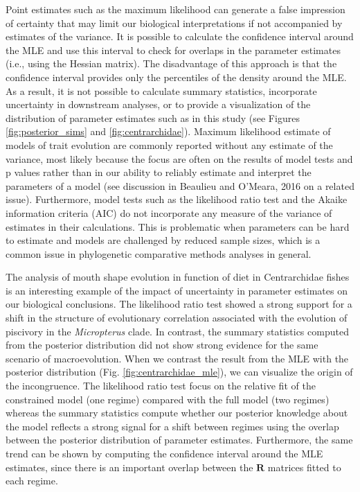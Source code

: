 Point estimates such as the maximum likelihood can generate a false impression of certainty that may limit our biological interpretations if not accompanied by estimates of the variance. It is possible to calculate the confidence interval around the MLE and use this interval to check for overlaps in the parameter estimates (i.e., using the Hessian matrix). The disadvantage of this approach is that the confidence interval provides only the percentiles of the density around the MLE. As a result, it is not possible to calculate summary statistics, incorporate uncertainty in downstream analyses, or to provide a visualization of the distribution of parameter estimates such as in this study (see Figures \ref{fig:posterior_sims} and \ref{fig:centrarchidae}). Maximum likelihood estimate of models of trait evolution are commonly reported without any estimate of the variance, most likely because the focus are often on the results of model tests and p values rather than in our ability to reliably estimate and interpret the parameters of a model (see discussion in Beaulieu and O'Meara, 2016 on a related issue). Furthermore, model tests such as the likelihood ratio test and the Akaike information criteria (AIC) do not incorporate any measure of the variance of estimates in their calculations. This is problematic when parameters can be hard to estimate and models are challenged by reduced sample sizes, which is a common issue in phylogenetic comparative methods analyses in general.

The analysis of mouth shape evolution in function of diet in Centrarchidae fishes \citep{revell_phylogenetic_2009} is an interesting example of the impact of uncertainty in parameter estimates on our biological conclusions. The likelihood ratio test showed a strong support for a shift in the structure of evolutionary correlation associated with the evolution of piscivory in the \textit{Micropterus} clade. In contrast, the summary statistics computed from the posterior distribution did not show strong evidence for the same scenario of macroevolution. When we contrast the result from the MLE with the posterior distribution (Fig. \ref{fig:centrarchidae_mle}), we can visualize the origin of the incongruence. The likelihood ratio test focus on the relative fit of the constrained model (one regime) compared with the full model (two regimes) whereas the summary statistics compute whether our posterior knowledge about the model reflects a strong signal for a shift between regimes using the overlap between the posterior distribution of parameter estimates. Furthermore, the same trend can be shown by computing the confidence interval around the MLE estimates, since there is an important overlap between the $\mathbf{R}$ matrices fitted to each regime.

